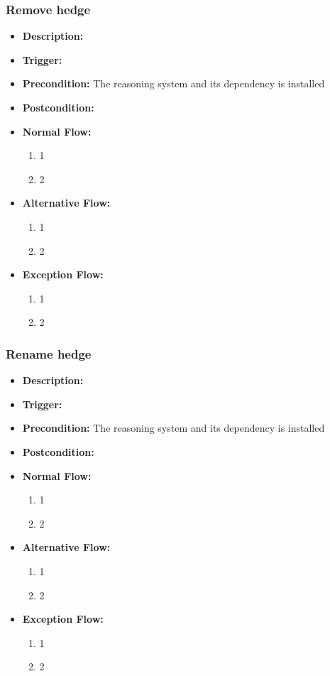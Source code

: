 \documentclass[../gr-final.tex]{subfiles}
\begin{document}
\subsubsection{Remove hedge}
\begin{itemize}
  \item {\bfseries Description:} 
  \item {\bfseries Trigger:}
  \item {\bfseries Precondition:} The reasoning system and its
    dependency is installed
    
  \item {\bfseries Postcondition:}

  \item {\bfseries Normal Flow:}
    \begin{enumerate}
      \item 1
      \item 2
    \end{enumerate}
  \item {\bfseries Alternative Flow:}
    \begin{enumerate}
      \item 1
      \item 2
    \end{enumerate}
  \item {\bfseries Exception Flow:}
    \begin{enumerate}
      \item 1
      \item 2
    \end{enumerate}
\end{itemize}
\subsubsection{Rename hedge}
\begin{itemize}
  \item {\bfseries Description:} 
  \item {\bfseries Trigger:}
  \item {\bfseries Precondition:} The reasoning system and its
    dependency is installed
    
  \item {\bfseries Postcondition:}

  \item {\bfseries Normal Flow:}
    \begin{enumerate}
      \item 1
      \item 2
    \end{enumerate}
  \item {\bfseries Alternative Flow:}
    \begin{enumerate}
      \item 1
      \item 2
    \end{enumerate}
  \item {\bfseries Exception Flow:}
    \begin{enumerate}
      \item 1
      \item 2
    \end{enumerate}
\end{itemize}
\end{document}
